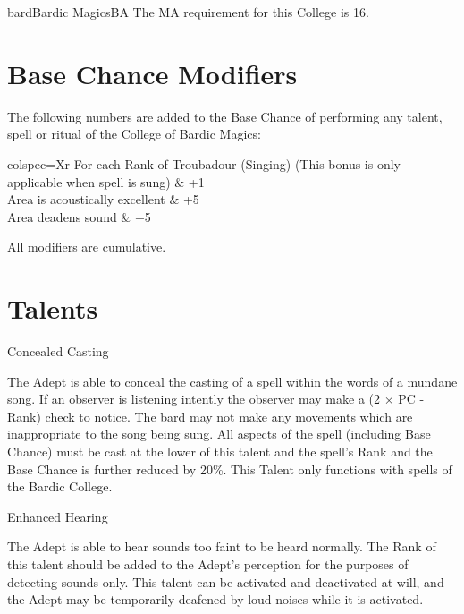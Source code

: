 \begin{College}[2.1]{bard}{Bardic Magics}{BA}
The MA requirement for this College is 16. 

\section{Base Chance Modifiers}

The following numbers are added to the Base Chance of performing any
talent, spell or ritual of the College of Bardic Magics:

\begin{dqtblr}{colspec={Xr}}
For each Rank of Troubadour (Singing) (This bonus is only applicable when spell is sung)	& +1 \\
Area is acoustically excellent	& +5 \\
Area deadens sound		& −5 \\
\end{dqtblr}

All modifiers are cumulative. 

\section{Talents}

\begin{talent}[T-1]{Concealed Casting}

\begin{effects}
The Adept is able to conceal the casting of a spell within the words
of a mundane song.  If an observer is listening intently the observer
may make a (2 × PC - Rank) check to notice. The bard may not make any
movements which are inappropriate to the song being sung.  All aspects
of the spell (including Base Chance) must be cast at the lower of this
talent and the spell’s Rank and the Base Chance is further reduced by
20\%. This Talent only functions with spells of the Bardic College.
\end{effects}
\end{talent}

\begin{talent}[T-2]{Enhanced Hearing}

\begin{effects}
The Adept is able to hear sounds too faint to be heard normally.  The
Rank of this talent should be added to the Adept’s perception for the
purposes of detecting sounds only.  This talent can be activated and
deactivated at will, and the Adept may be temporarily deafened by loud
noises while it is activated.
\end{effects}
\end{talent}



\end{College}

